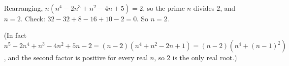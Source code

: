 Rearranging, $n\left(n^4-2n^3+n^2-4n+5\right)=2$, so the prime $n$ divides $2$, and $n=2$. Check: $32-32+8-16+10-2=0$. So $n=\boxed{2}$.

(In fact $n^5-2n^4+n^3-4n^2+5n-2=(n-2)\left(n^4+n^2-2n+1\right)=(n-2)\left(n^4+(n-1)^2\right)$, and the second factor is positive for every real $n$, so $2$ is the only real root.)
